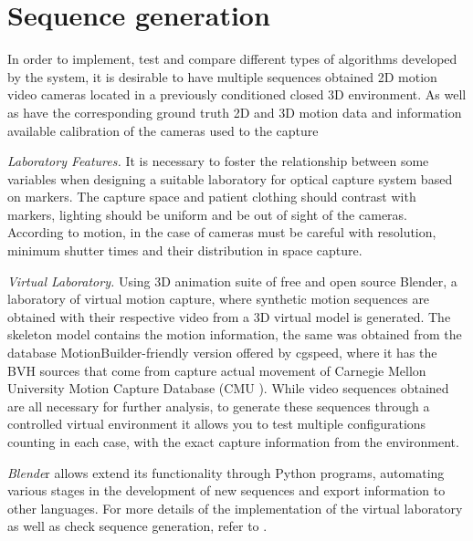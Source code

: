 \section{Sequence generation} 
\label{section_base_de_datos}
In order to implement, test and compare different types of algorithms developed by the system, it is desirable to have multiple sequences obtained 2D motion video cameras located in a previously conditioned closed 3D environment. As well as have the corresponding ground truth 2D and 3D motion data and information available calibration of the cameras used to the capture

\textit{Laboratory Features.}
\label{seccion_Caracteristicas_Laboratorio}
It is necessary to foster the relationship between some variables when designing a suitable laboratory for optical capture system based on markers. The capture space and patient clothing should contrast with markers, lighting should be uniform and be out of sight of the cameras. According to motion, in the case of cameras must be careful with resolution, minimum shutter times and their distribution in space capture.

\textit{Virtual Laboratory.} Using 3D animation suite of free and open source Blender, a laboratory of virtual motion capture, where synthetic motion sequences are obtained with their respective video from a 3D virtual model is generated.
The skeleton model contains the motion information, the same was obtained from the database MotionBuilder-friendly version offered by cgspeed, where it has the BVH sources that come from capture actual movement of Carnegie Mellon University Motion Capture Database (CMU ). While video sequences obtained are all necessary for further analysis, to generate these sequences through a controlled virtual environment it allows you to test multiple configurations counting in each case, with the exact capture information from the environment.

\emph{Blende}r allows extend its functionality through Python programs, automating various stages in the development of new sequences and export information to other languages.
For more details of the implementation of the virtual laboratory as well as check sequence generation, refer to \cite{proyecto_biomecanica}.

